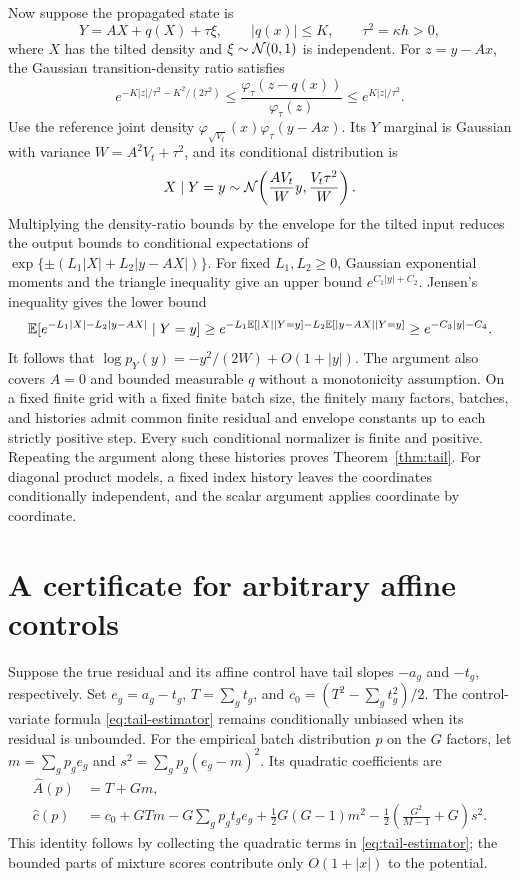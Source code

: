 Now suppose the propagated state is
\[
 Y=AX+q(X)+\tau\xi,\qquad |q(x)|\le K,\qquad \tau^2=\kappa h>0,
\]
where $X$ has the tilted density and $\xi\sim\mathcal N(0,1)$ is independent. For $z=y-Ax$, the Gaussian transition-density ratio satisfies
\[
 e^{-K|z|/\tau^2-K^2/(2\tau^2)}
 \le\frac{\varphi_\tau(z-q(x))}{\varphi_\tau(z)}
 \le e^{K|z|/\tau^2}.
\]
Use the reference joint density $\varphi_{\sqrt{V_t}}(x)\varphi_\tau(y-Ax)$. Its $Y$ marginal is Gaussian with variance $W=A^2V_t+\tau^2$, and its conditional distribution is
\[
 X\mid Y=y\sim\mathcal N\!\left(\frac{AV_t}{W}y,\frac{V_t\tau^2}{W}\right).
\]
Multiplying the density-ratio bounds by the envelope for the tilted input reduces the output bounds to conditional expectations of $\exp\{\pm(L_1|X|+L_2|y-AX|)\}$. For fixed $L_1,L_2\ge0$, Gaussian exponential moments and the triangle inequality give an upper bound $e^{C_1|y|+C_2}$. Jensen's inequality gives the lower bound
\[
 \mathbb E[e^{-L_1|X|-L_2|y-AX|}\mid Y=y]
 \ge e^{-L_1\mathbb E[|X|\mid Y=y]-L_2\mathbb E[|y-AX|\mid Y=y]}
 \ge e^{-C_3|y|-C_4}.
\]
It follows that $\log p_Y(y)=-y^2/(2W)+O(1+|y|)$. The argument also covers $A=0$ and bounded measurable $q$ without a monotonicity assumption. On a fixed finite grid with a fixed finite batch size, the finitely many factors, batches, and histories admit common finite residual and envelope constants up to each strictly positive step. Every such conditional normalizer is finite and positive. Repeating the argument along these histories proves Theorem~\ref{thm:tail}. For diagonal product models, a fixed index history leaves the coordinates conditionally independent, and the scalar argument applies coordinate by coordinate.

\section{A certificate for arbitrary affine controls}\label{app:general-control}
Suppose the true residual and its affine control have tail slopes $-a_g$ and $-t_g$, respectively. Set $e_g=a_g-t_g$, $T=\sum_g t_g$, and $c_0=(T^2-\sum_gt_g^2)/2$. The control-variate formula \eqref{eq:tail-estimator} remains conditionally unbiased when its residual is unbounded. For the empirical batch distribution $p$ on the $G$ factors, let $m=\sum_gp_ge_g$ and $s^2=\sum_gp_g(e_g-m)^2$. Its quadratic coefficients are
\begin{align}
 \widehat A(p)&=T+Gm,\\
 \widehat c(p)&=c_0+GTm-G\sum_gp_gt_ge_g+\tfrac12G(G-1)m^2
 -\tfrac12\left(\frac{G^2}{M-1}+G\right)s^2.\label{eq:controlled-c}
\end{align}
This identity follows by collecting the quadratic terms in \eqref{eq:tail-estimator}; the bounded parts of mixture scores contribute only $O(1+|x|)$ to the potential.

